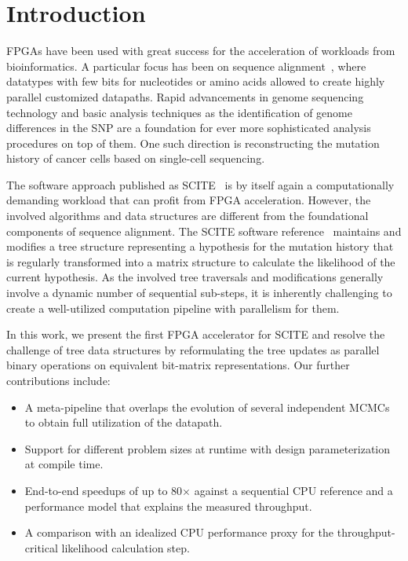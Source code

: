 \section{Introduction}
\acp{FPGA} have been used with great success for the acceleration of workloads from bioinformatics. A particular focus has been on sequence alignment~\cite{yu-kw-03a,zh-ta-07a,ja-la-08a}, where datatypes with few bits for nucleotides or amino acids allowed to create highly parallel customized datapaths. 
Rapid advancements in genome sequencing technology and basic analysis techniques as the identification of genome differences in the \ac{SNP} are a foundation for ever more sophisticated analysis procedures on top of them. One such direction is reconstructing the mutation history of cancer cells based on single-cell sequencing. 

The software approach published as \ac{SCITE}~\cite{tree2016} is by itself again a computationally demanding workload that can profit from FPGA acceleration. However, the involved algorithms and data structures are different from the foundational components of sequence alignment. The \ac{SCITE} software reference~\cite{tree2016} maintains and modifies a tree structure representing a hypothesis for the mutation history that is regularly transformed into a matrix structure to calculate the likelihood of the current hypothesis. As the involved tree traversals and modifications generally involve a dynamic number of sequential sub-steps, it is inherently challenging to create a well-utilized computation pipeline with parallelism for them.

In this work, we present the first \ac{FPGA} accelerator for \ac{SCITE} and resolve the challenge of tree data structures by reformulating the tree updates as parallel binary operations on equivalent bit-matrix representations. Our further contributions include:
\begin{itemize}
    \item A meta-pipeline that overlaps the evolution of several independent \acp{MCMC} to obtain full utilization of the datapath.
    \item Support for different problem sizes at runtime with design parameterization at compile time.
    \item End-to-end speedups of up to 80$\times$ against a sequential CPU reference and a performance model that explains the measured throughput.
    \item A comparison with an idealized CPU performance proxy for the throughput-critical likelihood calculation step.
\end{itemize}